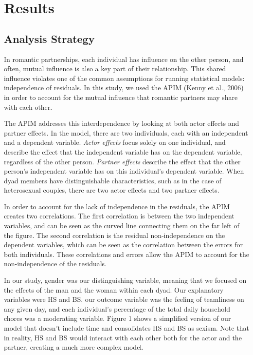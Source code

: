 \documentclass[
  man]{apa6}
\begin{document}
\hypertarget{results}{%
\section{Results}\label{results}}

\hypertarget{analysis-strategy}{%
\subsection{Analysis Strategy}\label{analysis-strategy}}

In romantic partnerships, each individual has influence on the other person, and often, mutual influence is also a key part of their relationship. This shared influence violates one of the common assumptions for running statistical models: independence of residuals. In this study, we used the APIM (Kenny et al., 2006) in order to account for the mutual influence that romantic partners may share with each other.

The APIM addresses this interdependence by looking at both actor effects and partner effects. In the model, there are two individuals, each with an independent and a dependent variable. \emph{Actor effects} focus solely on one individual, and describe the effect that the independent variable has on the dependent variable, regardless of the other person. \emph{Partner effects} describe the effect that the other person's independent variable has on this individual's dependent variable. When dyad members have distinguishable characteristics, such as in the case of heterosexual couples, there are two actor effects and two partner effects.

In order to account for the lack of independence in the residuals, the APIM creates two correlations. The first correlation is between the two independent variables, and can be seen as the curved line connecting them on the far left of the figure. The second correlation is the residual non-independence on the dependent variables, which can be seen as the correlation between the errors for both individuals. These correlations and errors allow the APIM to account for the non-independence of the residuals.

In our study, gender was our distinguishing variable, meaning that we focused on the effects of the man and the woman within each dyad. Our explanatory variables were HS and BS, our outcome variable was the feeling of teamliness on any given day, and each individual's percentage of the total daily household chores was a moderating variable. Figure 1 shows a simplified version of our model that doesn't include time and consolidates HS and BS as sexism. Note that in reality, HS and BS would interact with each other both for the actor and the partner, creating a much more complex model.
\end{document}
